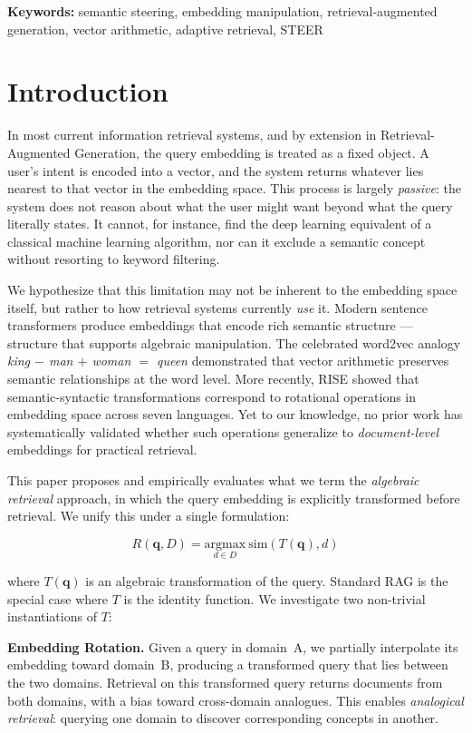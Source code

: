 \documentclass{article}
\begin{document}
\noindent\textbf{Keywords:} semantic steering, embedding manipulation, retrieval-augmented generation, vector arithmetic, adaptive retrieval, STEER

\section{Introduction}

In most current information retrieval systems, and by extension in Retrieval-Augmented Generation, the query embedding is treated as a fixed object. A user's intent is encoded into a vector, and the system returns whatever lies nearest to that vector in the embedding space. This process is largely \emph{passive}: the system does not reason about what the user might want beyond what the query literally states. It cannot, for instance, find the deep learning equivalent of a classical machine learning algorithm, nor can it exclude a semantic concept without resorting to keyword filtering.

We hypothesize that this limitation may not be inherent to the embedding space itself, but rather to how retrieval systems currently \emph{use} it. Modern sentence transformers produce embeddings that encode rich semantic structure --- structure that supports algebraic manipulation. The celebrated word2vec analogy \emph{king $-$ man $+$ woman $=$ queen} \cite{mikolov2013} demonstrated that vector arithmetic preserves semantic relationships at the word level. More recently, RISE \cite{rise2025} showed that semantic-syntactic transformations correspond to rotational operations in embedding space across seven languages. Yet to our knowledge, no prior work has systematically validated whether such operations generalize to \emph{document-level} embeddings for practical retrieval.

This paper proposes and empirically evaluates what we term the \emph{algebraic retrieval} approach, in which the query embedding is explicitly transformed before retrieval. We unify this under a single formulation:

\begin{equation}
R(\mathbf{q}, D) = \underset{d \in D}{\text{argmax}} \ \text{sim}(T(\mathbf{q}), d)
\end{equation}

where $T(\mathbf{q})$ is an algebraic transformation of the query. Standard RAG is the special case where $T$ is the identity function. We investigate two non-trivial instantiations of $T$:

\textbf{Embedding Rotation.} Given a query in domain~A, we partially interpolate its embedding toward domain~B, producing a transformed query that lies between the two domains. Retrieval on this transformed query returns documents from both domains, with a bias toward cross-domain analogues. This enables \emph{analogical retrieval}: querying one domain to discover corresponding concepts in another.
\end{document}
